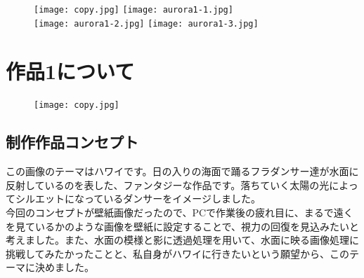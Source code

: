 \documentclass{jsarticle}
\begin{document}
\begin{center}
\vspace{30mm}
\end{center}
\begin{figure}[htbp]
\begin{center}
\texttt{[image: copy.jpg]}   
\texttt{[image: aurora1-1.jpg]}
\\   
\texttt{[image: aurora1-2.jpg]}   
\texttt{[image: aurora1-3.jpg]}

\end{center}
\end{figure}

\newpage
\tableofcontents
\newpage
\section{ 作品1について}
\begin{figure}[htbp]
\begin{center}
\texttt{[image: copy.jpg]}  
\end{center}
\end{figure}

\subsection{制作作品コンセプト}
この画像のテーマはハワイです。日の入りの海面で踊るフラダンサー達が水面に反射しているのを表した、ファンタジーな作品です。落ちていく太陽の光によってシルエットになっているダンサーをイメージしました。\\
\hspace{3mm}今回のコンセプトが壁紙画像だったので、PCで作業後の疲れ目に、まるで遠くを見ているかのような画像を壁紙に設定することで、視力の回復を見込みたいと考えました。また、水面の模様と影に透過処理を用いて、水面に映る画像処理に挑戦してみたかったことと、私自身がハワイに行きたいという願望から、このテーマに決めました。
\end{document}
